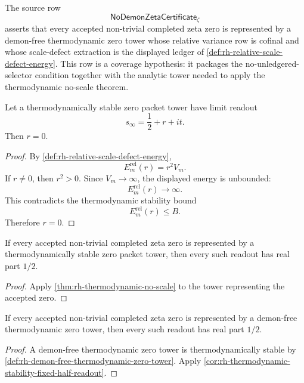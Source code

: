 \begin{definition}
\label{def:rh-no-demon-zeta-certificate}
The source row
$$
\mathsf{NoDemonZetaCertificate}_{\zeta}
$$
asserts that every accepted non-trivial completed zeta zero is
represented by a demon-free thermodynamic zero tower whose relative
variance row is cofinal and whose scale-defect extraction is the
displayed ledger of \autoref{def:rh-relative-scale-defect-energy}.  This
row is a coverage hypothesis: it packages the no-unledgered-selector
condition together with the analytic tower needed to apply the
thermodynamic no-scale theorem.
\end{definition}

\begin{theorem}
\label{thm:rh-thermodynamic-no-scale}
Let a thermodynamically stable zero packet tower have limit readout
$$
s_{\infty}=\frac12+r+it.
$$
Then $r=0$.
\end{theorem}

\begin{proof}
By \autoref{def:rh-relative-scale-defect-energy},
$$
E_m^{\mathrm{rel}}(r)=r^2V_m.
$$
If $r\neq0$, then $r^2>0$.  Since $V_m\to\infty$, the displayed energy
is unbounded:
$$
E_m^{\mathrm{rel}}(r)\to\infty.
$$
This contradicts the thermodynamic stability bound
$$
E_m^{\mathrm{rel}}(r)\le B.
$$
Therefore $r=0$.
\end{proof}

\begin{corollary}
\label{cor:rh-thermodynamic-stability-fixed-half-readout}
If every accepted non-trivial completed zeta zero is represented by a
thermodynamically stable zero packet tower, then every such readout has
real part $1/2$.
\end{corollary}

\begin{proof}
Apply \autoref{thm:rh-thermodynamic-no-scale} to the tower representing
the accepted zero.
\end{proof}

\begin{corollary}
\label{cor:rh-demon-free-towers-fixed-half-readout}
If every accepted non-trivial completed zeta zero is represented by a
demon-free thermodynamic zero tower, then every such readout has real
part $1/2$.
\end{corollary}

\begin{proof}
A demon-free thermodynamic zero tower is thermodynamically stable by
\autoref{def:rh-demon-free-thermodynamic-zero-tower}.  Apply
\autoref{cor:rh-thermodynamic-stability-fixed-half-readout}.
\end{proof}

